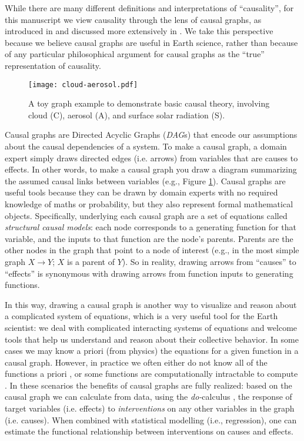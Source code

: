 \documentclass[12pt]{article}
\begin{document}
While there are many different definitions and interpretations of
``causality'', for this manuscript we view causality through the lens
of causal graphs, as introduced in \citet{pearl1995causal} and
discussed more extensively in \citet{pearl2009causality}. We take this
perspective because we believe causal graphs are useful in Earth
science, rather than because of any particular philosophical argument
for causal graphs as the ``true'' representation of causality.

\begin{figure} \texttt{[image: cloud-aerosol.pdf]}
  \caption{A toy graph example to demonstrate basic causal theory,
    involving cloud (C), aerosol (A), and surface solar radiation
    (S).}
  \label{fig:toy}
\end{figure}

Causal graphs are Directed Acyclic Graphs (\emph{DAG}s) that encode
our assumptions about the causal dependencies of a system. To make a
causal graph, a domain expert simply draws directed edges
(i.e. arrows) from variables that are causes to effects. In other
words, to make a causal graph you draw a diagram summarizing the
assumed causal links between variables (e.g., Figure
\ref{fig:toy}). Causal graphs are useful tools because they can be
drawn by domain experts with no required knowledge of maths or
probability, but they also represent formal mathematical
objects. Specifically, underlying each causal graph are a set of
equations called \emph{structural causal models}: each node
corresponds to a generating function for that variable, and the inputs
to that function are the node's parents. Parents are the other nodes
in the graph that point to a node of interest (e.g., in the most
simple graph $X \to Y$; $X$ is a parent of $Y$). So in reality,
drawing arrows from ``causes'' to ``effects'' is synonymous with
drawing arrows from function inputs to generating functions.

In this way, drawing a causal graph is another way to visualize and
reason about a complicated system of equations, which is a very useful
tool for the Earth scientist: we deal with complicated interacting
systems of equations and welcome tools that help us understand and
reason about their collective behavior. In some cases we may know a
priori (from physics) the equations for a given function in a causal
graph. However, in practice we often either do not know all of the
functions a priori \citep[e.g., plant stomata response to
VPD;][]{massmann2019, zhou2019arid, zhou2019feedback, grossiord2020},
or some functions are computationally intractable to compute
\citep[e.g., turbulence, moist convection, and cloud microphysics in
large scale models;][]{zadra2018,gentine2018}. In these scenarios the
benefits of causal graphs are fully realized: based on the causal
graph we can calculate from data, using the \textit{do-}calculus
\citep{pearl-1994-do-calculus}, the response of target variables
(i.e. effects) to \textit{interventions} on any other variables in the
graph (i.e. causes). When combined with statistical modelling (i.e.,
regression), one can estimate the functional relationship between
interventions on causes and effects.
\end{document}
